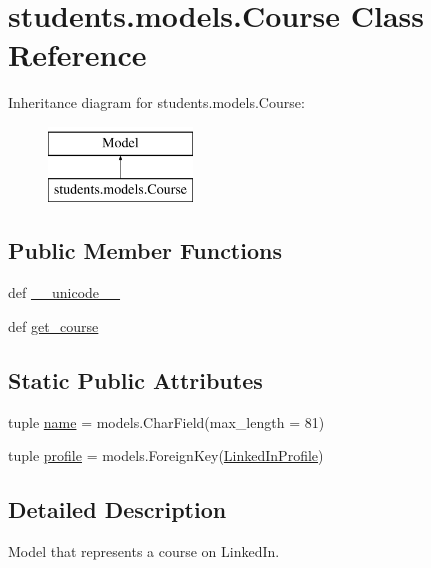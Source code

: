 \hypertarget{classstudents_1_1models_1_1_course}{\section{students.\-models.\-Course Class Reference}
\label{classstudents_1_1models_1_1_course}
}
Inheritance diagram for students.\-models.\-Course\-:\begin{figure}[H]
\begin{center}
\leavevmode
\includegraphics[height=2.000000cm]{classstudents_1_1models_1_1_course}
\end{center}
\end{figure}
\subsection*{Public Member Functions}
\begin{DoxyCompactItemize}
\item 
def \hyperlink{classstudents_1_1models_1_1_course_afcde6983ecb364eb3d26811950f531b0}{\-\_\-\-\_\-unicode\-\_\-\-\_\-}
\item 
def \hyperlink{classstudents_1_1models_1_1_course_afd219fece1d92c93deb18841782d6a16}{get\-\_\-course}
\end{DoxyCompactItemize}
\subsection*{Static Public Attributes}
\begin{DoxyCompactItemize}
\item 
tuple \hyperlink{classstudents_1_1models_1_1_course_a6167f80718f9a71b41abba99105a079c}{name} = models.\-Char\-Field(max\-\_\-length = 81)
\item 
tuple \hyperlink{classstudents_1_1models_1_1_course_aadeceab75e5b99ede00f30b2f56da749}{profile} = models.\-Foreign\-Key(\hyperlink{classstudents_1_1models_1_1_linked_in_profile}{Linked\-In\-Profile})
\end{DoxyCompactItemize}


\subsection{Detailed Description}
\begin{DoxyVerb}Model that represents a course on LinkedIn.
\end{DoxyVerb}
 

